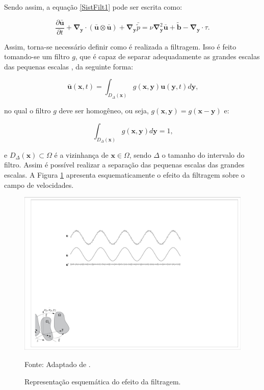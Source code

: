 \documentclass[_ArquivoPrincipal.tex]{subfiles}
\begin{document}
Sendo assim, a equação \ref{SistFilt1} pode ser escrita como:

\begin{equation}
    \frac{\partial\bar{\mathbf{u}}}{\partial t}+\mathbf{\nabla}_\mathbf{y}\cdot{(\bar{\mathbf{u}}\otimes\bar{\mathbf{u}})}+\mathbf{\nabla}_\mathbf{y}\bar{\tilde{p}}=\nu\mathbf{\nabla}^2_\mathbf{y}\bar{\mathbf{u}}+\tilde{\mathbf{b}}-\mathbf{\nabla}_\mathbf{y}\cdot\tau\text{.}
    \label{EqFiltrada}
\end{equation}

Assim, torna-se necessário definir como é realizada a filtragem. Isso é feito tomando-se um filtro $g$, que é capaz de separar adequadamente as grandes escalas das pequenas escalas \cite{hughes2000large}, da seguinte forma:

\begin{equation}
    \bar{\mathbf{u}}(\mathbf{x},t)=\int_{D_\Delta(\mathbf{x})}{g(\mathbf{x},\mathbf{y})\mathbf{u}(\mathbf{y},t)d\mathbf{y}}\text{,}
    \label{Filtro1}
\end{equation}

\noindent no qual o filtro $g$ deve ser homogêneo, ou seja, $g(\mathbf{x},\mathbf{y})=g(\mathbf{x}-\mathbf{y})$ e:

\begin{equation}
    \int_{D_\Delta(\mathbf{x})}{g(\mathbf{x},\mathbf{y})d\mathbf{y}}=1\text{,}
    \label{Filtro2}
\end{equation}

\noindent e $D_\Delta(\mathbf{x})\subset\Omega$ é a vizinhança de $\mathbf{x}\in\Omega$, sendo $\Delta$ o tamanho do intervalo do filtro. Assim é possível realizar a separação das pequenas escalas das grandes escalas. A Figura \ref{fig:Filtragem} apresenta esquematicamente o efeito da filtragem sobre o campo de velocidades.

\begin{figure}[h]
    \centering
    \includegraphics[width=0.75\linewidth]{Figuras/Filtragem.pdf}
    \caption{Representação esquemática do efeito da filtragem.}
    Fonte: Adaptado de .
    \label{fig:Filtragem}
\end{figure}
\end{document}
